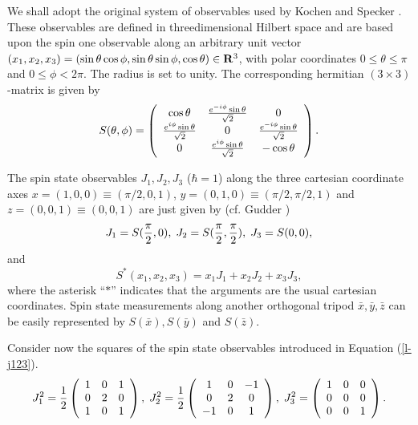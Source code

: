 We shall adopt the original system of observables used by Kochen and
Specker
\cite{kochen1}. These observables are defined in threedimensional
Hilbert space and are based upon the spin one
observable  along an arbitrary unit vector
$(x_1,x_2,x_3)=(\sin \theta \cos \phi ,\sin \theta \sin \phi ,\cos \theta )\in
{\Bbb R}^3$, with polar coordinates $0\le \theta \le \pi$ and
$0\le \phi < 2\pi$. The radius is set to unity.
The corresponding hermitian
$(3\times
3)$-matrix  is given by
\begin{equation}
\label{l-soksp}
S(\theta , \phi )=
\left(
\begin{array}{ccc}
\cos \theta & {e^{-i\phi}\sin \theta \over \sqrt{2}}& 0      \\
{e^{i\phi}\sin \theta \over \sqrt{2}}& 0
& {e^{-i\phi}\sin \theta \over \sqrt{2}}      \\
0& {e^{i\phi}\sin \theta \over \sqrt{2}}& -\cos \theta
\end{array}\right).
\end{equation}


The spin
state observables
$J_1,J_2,J_3$
($\hbar =1$)
along the three cartesian coordinate axes $x=(1,0,0)\equiv ({\pi /
2},0,1)$, $y=(0,1,0)\equiv ({\pi / 2},{\pi
/ 2},1)$ and $z=(0,0,1) \equiv (0,0,1)$ are just given by
 (cf. Gudder
\cite[pp. 54-57]{gudder})
\begin{equation}
J_1= S({\pi \over 2},0),
\;
J_2= S({\pi \over 2},{\pi \over 2}),
\;
J_3= S(0,0),
\label{l-j123}
\end{equation}
and
\begin{equation}
\label{ansatz-so}
S^\ast (x_1,x_2,x_3)=
x_1J_1+
x_2J_2+
x_3J_3 ,
\end{equation}
where the asterisk ``$\ast$'' indicates that the arguments are
the usual cartesian coordinates.
Spin state measurements along another orthogonal tripod
$\bar{x},\bar{y},\bar{z}$ can be
easily represented by $S(\bar{x}),S(\bar{y})$ and $S(\bar{z})$.


Consider now
the squares of the spin state observables introduced in Equation
(\ref{l-j123}).
\begin{equation}
J_1^2= {1\over 2}
\left(
\begin{array}{ccc}
1&0&1\\
0&2&0\\
1&0&1
\end{array}
\right), \;
J_2^2= {1\over 2}
\left(
\begin{array}{ccc}
1&0&-1\\
0&2&0\\
-1&0&1
\end{array}
\right), \;
J_3^2=
\left(
\begin{array}{ccc}
1&0&0\\
0&0&0\\
0&0&1\\
\end{array}
\right).
\end{equation}

